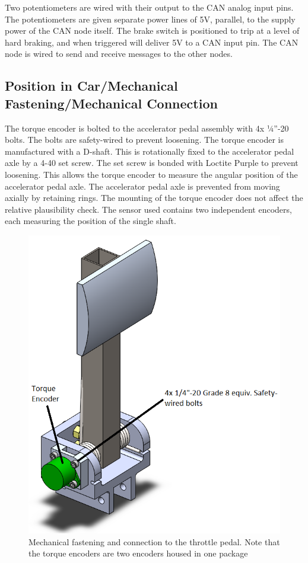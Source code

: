 \documentclass{article}
\begin{document}
        Two potentiometers are wired with their output to the CAN analog input pins. The potentiometers are given separate power lines of 5V, parallel, to the supply power of the CAN node itself. The brake switch is positioned to trip at a level of hard braking, and when triggered will deliver 5V to a CAN input pin. The CAN node is wired to send and receive messages to the other nodes.

    \subsection{Position in Car/Mechanical Fastening/Mechanical Connection}


        The torque encoder is bolted to the accelerator pedal assembly with 4x ¼”-20 bolts. The bolts are safety-wired to prevent loosening. The torque encoder is manufactured with a D-shaft. This is rotationally fixed to the accelerator pedal axle by a 4-40 set screw. The set screw is bonded with Loctite Purple to prevent loosening. This allows the torque encoder to measure the angular position of the accelerator pedal axle. The accelerator pedal axle is prevented from moving axially by retaining rings. The mounting of the torque encoder does not affect the relative plausibility check. The sensor used contains two independent encoders, each measuring the position of the single shaft.

        \begin{figure}[H]
            \centering
            \includegraphics[width = 0.5 \textwidth]{torqueencoder}
            \caption{Mechanical fastening and connection to the throttle pedal. Note that the torque encoders are two encoders housed in one package}
            \label{torquefront}
        \end{figure}
\end{document}
